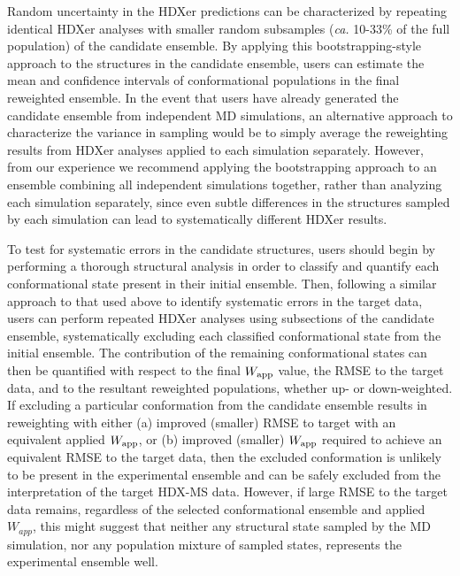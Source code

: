 \documentclass[9pt,tutorial]{livecoms}
\begin{document}
Random uncertainty in the HDXer predictions can be characterized by repeating identical HDXer analyses with smaller random subsamples (\textit{ca.} 10-33\% of the full population) of the candidate ensemble.
By applying this bootstrapping-style approach to the structures in the candidate ensemble, users can estimate the mean and confidence intervals of conformational populations in the final reweighted ensemble.
In the event that users have already generated the candidate ensemble from independent MD simulations, an alternative approach to characterize the variance in sampling would be to simply average the reweighting results from HDXer analyses applied to each simulation separately.
However, from our experience we recommend applying the bootstrapping approach to an ensemble combining all independent simulations together, rather than analyzing each simulation separately, since even subtle differences in the structures sampled by each simulation can lead to systematically different HDXer results.

To test for systematic errors in the candidate structures, users should begin by performing a thorough structural analysis in order to classify and quantify each conformational state present in their initial ensemble.
Then, following a similar approach to that used above to identify systematic errors in the target data, users can perform repeated HDXer analyses using subsections of the candidate ensemble, systematically excluding each classified conformational state from the initial ensemble. 
The contribution of the remaining conformational states can then be quantified with respect to the final $W_{\textnormal{app}}$ value, the RMSE to the target data, and to the resultant reweighted populations, whether up- or down-weighted.
If excluding a particular conformation from the candidate ensemble results in reweighting with either (a) improved (smaller) RMSE to target with an equivalent applied $W_{\textnormal{app}}$, or (b) improved (smaller) $W_{\textnormal{app}}$ required to achieve an equivalent RMSE to the target data, then the excluded conformation is unlikely to be present in the experimental ensemble and can be safely excluded from the interpretation of the target HDX-MS data.
However, if large RMSE to the target data remains, regardless of the selected conformational ensemble and applied $W_{app}$, this might suggest that neither any structural state sampled by the MD simulation, nor any population mixture of sampled states, represents the experimental ensemble well.
\end{document}

